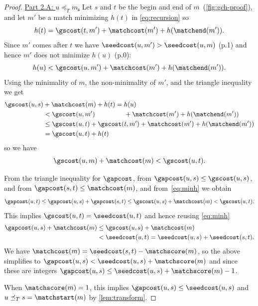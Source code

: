 \begin{proof}
  \underline{Part 2.A: $u\preceq_T m$.}
  Let $s$ and $t$ be the begin and end of $m$~(\cref{fig:gch-proof}),
  and let $m'$ be a match minimizing $h(t)$ in \cref{eq:recursion} so
  \begin{equation*}
  h(t) = \gscost(t, m') + \matchcost(m') + h(\matchend(m')).
  \end{equation*}
  Since $m'$ comes after $t$ we have ${\seedcost(u, m') > \seedcost(u, m)}$
  (p.1) and hence $m'$ does not minimize $h(u)$ (p.0):
  \begin{equation*}
    h(u) < \gscost(u, m') + \matchcost(m') +  h(\matchend(m')).
  \end{equation*}
  Using the minimality of $m$, the non-minimality of $m'$, and the triangle inequality we get
  \begin{align*}
    \gscost(u, s) &+ \matchcost(m) + h(t) = h(u)\\
    & < \gscost(u, m') \hspace{4.5em}+ \matchcost(m') +  h(\matchend(m'))\\
    &\leq \gscost(u, t) + \gscost(t, m') + \matchcost(m') + h(\matchend(m'))\\
    &= \gscost(u, t) + h(t)
  \end{align*}
  so we have
  \begin{equation}
  \gscost(u, m) + \matchcost(m) < \gscost(u, t).\label{eq:minh}
  \end{equation}

  From the triangle inequality for $\gapcost$, from $\gapcost(u, s) \leq
  \gscost(u, s)$, and from $\gapcost(s, t) \leq \matchcost(m)$, and
  from~\cref{eq:minh} we obtain
  \begin{equation*}
    \gapcost(u, t)
    \leq \gapcost(u, s) + \gapcost(s, t)
    \leq \gscost(u, s) + \matchcost(m)
    < \gscost(u, t).
  \end{equation*}
  This implies $\gscost(u, t) = \seedcost(u,t)$ and hence reusing \cref{eq:minh}
  \begin{align*}
    \gapcost(u, s) + \matchcost(m)
    &\leq \gscost(u, s) + \matchcost(m)\\
    &< \seedcost(u, t)
    = \seedcost(u, s) + \seedcost(s, t).
  \end{align*}
  We have $\matchcost(m) = \seedcost(s, t) - \matchscore(m)$, so the above
  simplifies to $\gapcost(u, s) < \seedcost(u, s) + \matchscore(m)$ and since
  these are integers $\gapcost(u, s) \leq \seedcost(u, s) + \matchscore(m) - 1$.

  When $\matchscore(m) = 1$, this implies $\gapcost(u, s) \leq \seedcost(u, s)$
  and $u\preceq_T s = \matchstart(m)$ by \cref{lem:transform}.


\end{proof}
